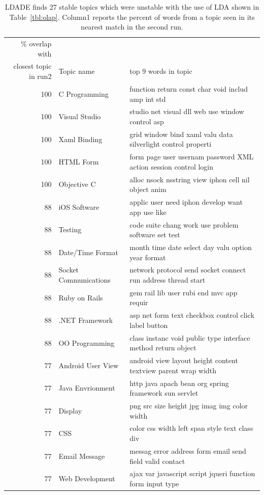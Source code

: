\documentclass[twocolumn,5p,sort&compress]{elsarticle}
\theoremstyle{break}
\begin{document}
\begin{table}[!t]
\renewcommand{\baselinestretch}{0.75}
\begin{center}
\footnotesize
\caption{LDADE finds 27 stable topics which were unstable with the use of LDA shown in Table~\ref{tbl:olap}. Column1 reports the percent
of words from a topic seen in its nearest match in the second run.}
\label{tbl:olap_stable}
\begin{tabular}{r|l|l}
\% overlap with & &\\
closest topic in run2  & Topic name & top 9 words in topic\\\hline
100 &C Programming & function return const char void includ amp int std\\
100 &Visual Studio & studio net visual dll web use window control asp\\
100 &Xaml Binding & grid window bind xaml valu data silverlight control properti\\
100 &HTML Form & form page user usernam password XML action session control login\\
100 &Objective C & alloc nsock nsstring view iphon cell nil object anim\\
88 &iOS Software & applic user need iphon develop want app use like\\
88 &Testing & code suite chang work use problem software set test\\
88 &Date/Time Format & month time date select day valu option year format\\
88 &Socket Communications & network protocol send socket connect run address thread start \\
88 & Ruby on Rails & gem rail lib user rubi end mvc app requir  \\
88 &.NET Framework & asp net form text checkbox control click label button\\
88 &OO Programming & class instanc void public type interface method return object\\
77 &Android User View & android view layout height content textview parent wrap width\\
77 &Java Envrionment & http java apach bean org spring framework sun servlet \\
77 &Display & png src size height jpg imag img color width\\
77 & CSS & color css width left span style text class div\\
77 &Email Message & messag error address form email send field  valid contact\\
77 &Web Development & ajax var javascript script jqueri function form input type\\

\end{tabular}
\end{center}
\end{table}
\end{document}
